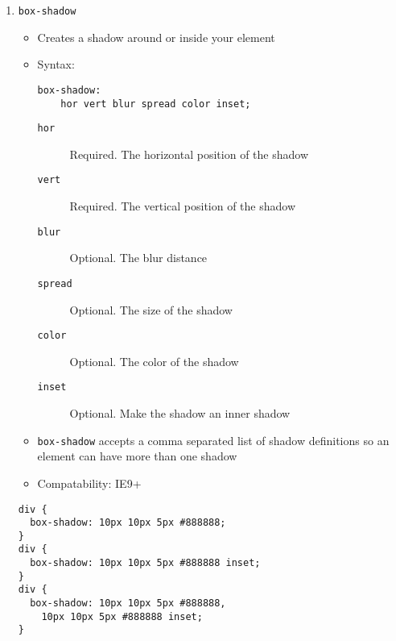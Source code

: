 \documentclass[10pt, twocolumn]{article}
\begin{document}
\begin{enumerate}
\item \texttt{box-shadow}
\begin{itemize}
\item Creates a shadow around or inside your element
\item Syntax:
\begin{lstlisting}[frame=single]
box-shadow: 
    hor vert blur spread color inset;
\end{lstlisting}
\begin{description}
\item[\texttt{hor}] Required.  The horizontal position of the shadow
\item[\texttt{vert}] Required.  The vertical position of the shadow
\item[\texttt{blur}] Optional.  The blur distance
\item[\texttt{spread}] Optional.  The size of the shadow
\item[\texttt{color}] Optional.  The color of the shadow
\item[\texttt{inset}] Optional.  Make the shadow an inner shadow
\end{description}
\item \texttt{box-shadow} accepts a comma separated list of shadow definitions so an element can have more than one shadow
\item Compatability: IE9+
\end{itemize}
\begin{lstlisting}[frame=single]
div {
  box-shadow: 10px 10px 5px #888888;
}
div {
  box-shadow: 10px 10px 5px #888888 inset;
}
div {
  box-shadow: 10px 10px 5px #888888, 
    10px 10px 5px #888888 inset;
}
\end{lstlisting}


\end{enumerate}
\end{document}
